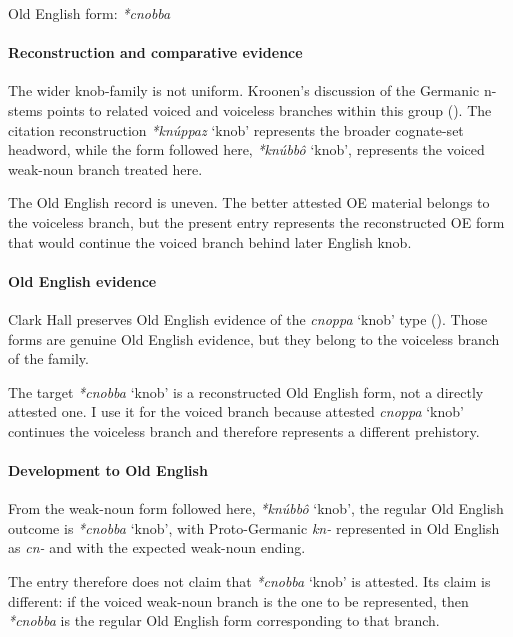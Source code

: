 \documentclass[
  british,
  a4paper,
]{article}
\providecommand{\Recon}[1]{\emph{*#1}}
\begin{document}
Old English form: \emph{*cnobba}

\paragraph{Reconstruction and comparative
evidence}\label{reconstruction-and-comparative-evidence-148}

The wider knob-family is not uniform. Kroonen's discussion of the
Germanic n-stems points to related voiced and voiceless branches within
this group (). The citation
reconstruction \Recon{knúppaz} `knob' represents the broader cognate-set
headword, while the form followed here, \Recon{knúbbô} `knob',
represents the voiced weak-noun branch treated here.

The Old English record is uneven. The better attested OE material
belongs to the voiceless branch, but the present entry represents the
reconstructed OE form that would continue the voiced branch behind later
English knob.

\paragraph{Old English evidence}\label{old-english-evidence-150}

Clark Hall preserves Old English evidence of the {\emph{cnoppa}} `knob'
type (). Those forms
are genuine Old English evidence, but they belong to the voiceless
branch of the family.

The target \Recon{cnobba} `knob' is a reconstructed Old English form,
not a directly attested one. I use it for the voiced branch because
attested {\emph{cnoppa}} `knob' continues the voiceless branch and
therefore represents a different prehistory.

\paragraph{Development to Old
English}\label{development-to-old-english-149}

From the weak-noun form followed here, \Recon{knúbbô} `knob', the
regular Old English outcome is \Recon{cnobba} `knob', with
Proto-Germanic \emph{kn-} represented in Old English as \emph{cn-} and
with the expected weak-noun ending.

The entry therefore does not claim that \Recon{cnobba} `knob' is
attested. Its claim is different: if the voiced weak-noun branch is the
one to be represented, then \Recon{cnobba} is the regular Old English
form corresponding to that branch.
\end{document}
